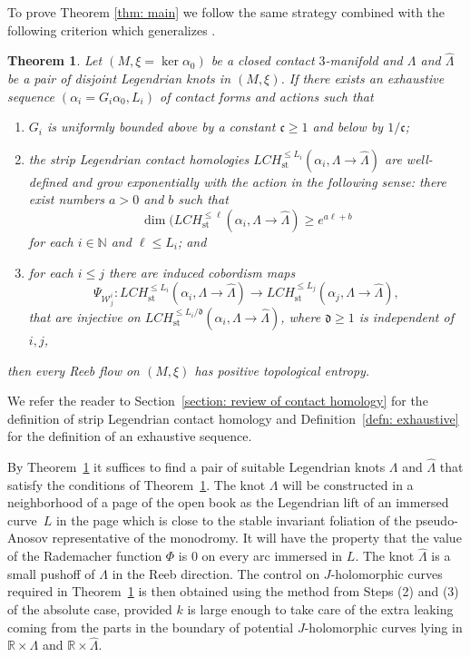 \documentclass[JEP,XML,SOM,Unicode,NoFloatCountersInSection]{cedram}
\let\mathcal\mathscr
\let\ra\rightarrow
\newcommand{\st}{\mathrm{st}}
\theoremstyle{plain}
\newtheorem{thm}{Theorem}[section]
\theoremstyle{definition}
\numberwithin{equation}{subsection}
\newcommand{\RR}{\mathbb{R}}
\newcommand{\NN}{\mathbb{N}}
\newcommand{\be}{\begin{enumerate}}
\newcommand{\ee}{\end{enumerate}}
\begin{document}
To prove Theorem \ref{thm: main} we follow the same strategy combined with the following criterion which generalizes \cite[Th.\,1]{Al}.

\begin{thm}\label{thm:criterion}
Let $(M,\xi =\ker \alpha_0)$ be a closed contact $3$-manifold and $\Lambda$ and $\widehat{\Lambda}$ be a pair of disjoint Legendrian knots in $(M,\xi)$. If there exists an exhaustive sequence $(\alpha_i=G_i\alpha_0,L_i)$ of contact forms and actions such that
\be
\item\label{thm:criterion1} $G_i$ is uniformly bounded above by a constant ${\mathfrak c}\geq 1$ and below by ${1/{\mathfrak c}}$;
\item\label{thm:criterion2} the strip Legendrian contact homologies $LCH_{\st}^{\leq L_i}(\alpha_i, \Lambda\ra\widehat{\Lambda})$ are well-defined and grow exponentially with the action in the following sense: there exist numbers $a>0$ and $b$ such that
$$\dim(LCH_{\st}^{\leq \ell}(\alpha_i,\Lambda\ra\widehat{\Lambda})\geq e^{a\ell +b}$$
for each $i\in\NN$ and $\ell\leq L_i$; and
\item\label{thm:criterion3} for each $i\leq j$ there are induced cobordism maps
$$\Psi_{\mathcal{W}^i_j}: LCH_{\st}^{\leq L_i}(\alpha_i, \Lambda\ra\widehat{\Lambda})\to LCH_{\st}^{\leq L_j}(\alpha_j, \Lambda\ra\widehat{\Lambda}),$$
that are injective on $LCH_{\st}^{\leq L_i/{\mathfrak d}}(\alpha_i, \Lambda\ra\widehat{\Lambda})$, where ${\mathfrak d}\geq 1$ is independent of $i,j$,
\ee
then every Reeb flow on $(M,\xi)$ has positive topological entropy.
\end{thm}

We refer the reader to Section~\ref{section: review of contact homology} for the definition of strip Legendrian contact homology and Definition~\ref{defn: exhaustive} for the definition of an exhaustive sequence.

By Theorem~\ref{thm:criterion} it suffices to find a pair of suitable Legendrian knots $\Lambda$ and $\widehat{\Lambda}$ that satisfy the conditions of Theorem~\ref{thm:criterion}. The knot $\Lambda$ will be constructed in a neighborhood of a page of the open book as the Legendrian lift of an immersed curve~$L$ in the page which is close to the stable invariant foliation of the pseudo-Anosov representative of the monodromy. It will have the property that the value of the Rademacher function $\Phi$ is $0$ on every arc immersed in $L$. The knot $\widehat{\Lambda}$ is a small pushoff of $\Lambda$ in the Reeb direction. The control on $J$-holomorphic curves required in Theorem~\ref{thm:criterion} is then obtained using the method from Steps (2) and (3) of the absolute case, provided $k$ is large enough to take care of the extra leaking coming from the parts in the boundary of potential $J$-holomorphic curves lying in $\RR\times\Lambda$ and $\RR\times \widehat{\Lambda}$.
\end{document}
